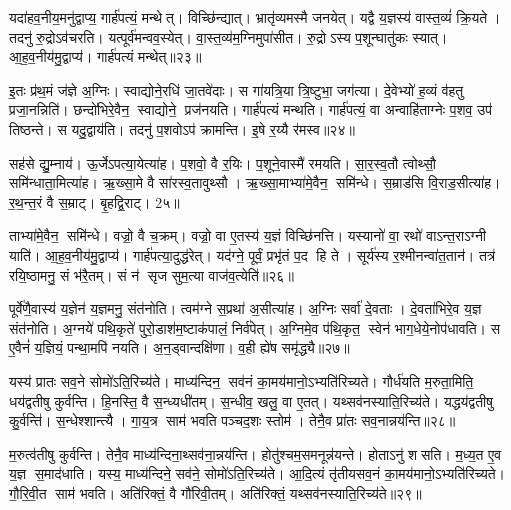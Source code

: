 यदा॑हव॒नीय॒मनु॑द्वाप्य॒ गार्\mbox{}ह॑पत्यं॒ मन्थेत्। विच्छि॑न्द्यात्। भ्रातृ॑व्यमस्मै जनयेत्। यद्वै य॒ज्ञस्य॑ वास्त॒व्यं॑ क्रि॒यते। तदनु॑ रु॒द्रोऽव॑चरति। यत्पूर्व॑मन्वव॒स्येत्। वा॒स्त॒व्य॑म॒ग्निमुपा॑सीत। रु॒द्रोऽस्य प॒शून्घातु॑कः स्यात्। आ॒ह॒व॒नीय॑मु॒द्वाप्य॑। गार्\mbox{}ह॑पत्यं मन्थेत्॥२३॥

इ॒तः प्र॑थ॒मं ज॑ज्ञे अ॒ग्निः। स्वाद्योने॒रधि॑ जा॒तवे॑दाः। स गा॑यत्रि॒या त्रि॒ष्टुभा॒ जग॑त्या। दे॒वेभ्यो॑ ह॒व्यं व॑हतु प्रजा॒नन्निति॑। छन्दो॑भिरे॒वैन॒ स्वाद्योने॒ प्रज॑नयति। गार्\mbox{}ह॑पत्यं मन्थति। गार्\mbox{}ह॑पत्यं॒ वा अन्वाहि॑ताग्नेः प॒शव॒ उप॑ तिष्ठन्ते। स यदु॒द्वाय॑ति। तदनु॑ प॒शवोऽप॑ क्रामन्ति। इ॒षे र॒य्यै र॑मस्व॥२४॥

सह॑से द्यु॒म्नाय॑। ऊ॒र्जेऽपत्या॒येत्या॑ह। प॒शवो॒ वै र॒यिः। प॒शूने॒वास्मै॑ रमयति। सा॒र॒स्व॒तौ त्वोथ्सौ॒ समि॑न्धाता॒मित्या॑ह। ऋ॒ख्सा॒मे वै सा॑रस्व॒तावुथ्सौ। ऋ॒ख्सा॒माभ्या॑मे॒वैन॒ समि॑न्धे। स॒म्राड॑सि वि॒राड॒सीत्या॑ह। र॒थ॒न्त॒रं वै स॒म्राट्। बृ॒हद्वि॒राट्। 2५॥

ताभ्या॑मे॒वैन॒ समि॑न्धे। वज्रो॒ वै च॒क्रम्। वज्रो॒ वा ए॒तस्य॑ य॒ज्ञं विच्छि॑नत्ति। यस्यानो॑ वा॒ रथो॑ वाऽन्त॒राऽग्नी याति॑। आ॒ह॒व॒नीय॑मु॒द्वाप्य॑। गार्\mbox{}ह॑पत्या॒दुद्ध॑रेत्। यद॑ग्ने॒ पूर्वं॒ प्रभृ॑तं प॒द हि ते। सूर्य॑स्य र॒श्मीनन्वा॑त॒तान॑। तत्र॑ रयि॒ष्ठामनु॒ सं भ॑रै॒तम्। सं न॑ सृज सुम॒त्या वाज॑व॒त्येति॑॥२६॥

पूर्वे॑णै॒वास्य॑ य॒ज्ञेन॑ य॒ज्ञमनु॒ संत॑नोति। त्वम॑ग्ने स॒प्रथा॑ अ॒सीत्या॑ह। अ॒ग्निः सर्वा॑ दे॒वताः। दे॒वता॑भिरे॒व य॒ज्ञ संत॑नोति। अ॒ग्नये॑ पथि॒कृते॑ पुरो॒डाश॑म॒ष्टाक॑पालं॒ निर्व॑पेत्। अ॒ग्निमे॒व प॑थि॒कृत॒ स्वेन॑ भाग॒धेये॒नोप॑धावति। स ए॒वैनं॑ य॒ज्ञियं॒ पन्था॒मपि॑ नयति। अ॒न॒ड्वान्दक्षि॑णा। व॒ही ह्ये॑ष समृ॑द्ध्यै॥२७॥

यस्य॑ प्रातः सव॒ने सोमो॑ऽति॒रिच्य॑ते। माध्य॑न्दिन॒ सव॑नं का॒मय॑मानो॒ऽभ्यति॑रिच्यते। गौर्ध॑यति म॒रुता॒मिति॒ धय॑द्वतीषु कुर्वन्ति। हि॒नस्ति॒ वै स॒न्ध्यधी॑तम्। स॒न्धीव॒ खलु॒ वा ए॒तत्। यथ्सव॑नस्याति॒रिच्य॑ते। यद्धय॑द्वतीषु कु॒र्वन्ति॑। स॒न्धेश्शान्त्यै। गा॒य॒त्र साम॑ भवति पञ्चद॒शः स्तोम॑। तेनै॒व प्रा॑तः सव॒नान्नय॑न्ति॥२८॥

म॒रुत्व॑तीषु कुर्वन्ति। तेनै॒व माध्य॑न्दिना॒थ्सव॑ना॒न्नय॑न्ति। होतु॑श्चम॒समनून्न॑यन्ते। होताऽनु॑ शसति। म॒ध्य॒त ए॒व य॒ज्ञ स॒माद॑धाति। यस्य॒ माध्य॑न्दिने॒ सव॑ने॒ सोमो॑ऽति॒रिच्य॑ते। आ॒दि॒त्यं तृ॑तीयसव॒नं का॒मय॑मानो॒ऽभ्यति॑रिच्यते। गौ॒रि॒वी॒त साम॑ भवति। अति॑रिक्तं॒ वै गौ॑रिवी॒तम्। अति॑रिक्तं॒ यथ्सव॑नस्याति॒रिच्य॑ते॥२९॥

